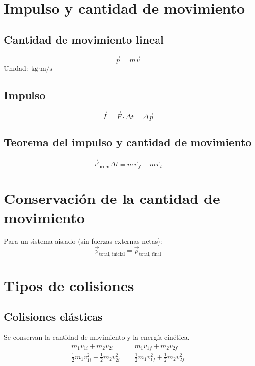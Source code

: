 \section{Impulso y cantidad de movimiento}

\subsection{Cantidad de movimiento lineal}
\begin{equation}
    \vec{p} = m \vec{v}
\end{equation}
Unidad: \(\text{kg} \cdot \text{m/s}\)

\subsection{Impulso}
\begin{equation}
    \vec{I} = \vec{F} \cdot \Delta t = \Delta \vec{p}
\end{equation}

\subsection{Teorema del impulso y cantidad de movimiento}
\begin{equation}
    \vec{F}_{\text{prom}} \Delta t = m \vec{v}_f - m \vec{v}_i
\end{equation}

\section{Conservación de la cantidad de movimiento}
Para un sistema aislado (sin fuerzas externas netas):
\begin{equation}
    \vec{p}_{\text{total, inicial}} = \vec{p}_{\text{total, final}}
\end{equation}

\section{Tipos de colisiones}

\subsection{Colisiones elásticas}
Se conservan la cantidad de movimiento y la energía cinética.
\begin{align}
    m_1 v_{1i} + m_2 v_{2i} &= m_1 v_{1f} + m_2 v_{2f} \\
    \frac{1}{2} m_1 v_{1i}^2 + \frac{1}{2} m_2 v_{2i}^2 &= \frac{1}{2} m_1 v_{1f}^2 + \frac{1}{2} m_2 v_{2f}^2
\end{align}


